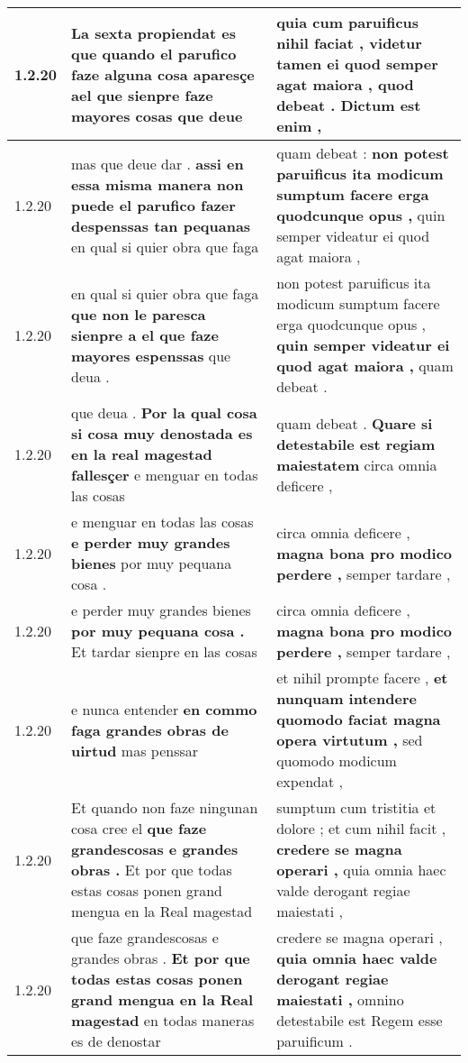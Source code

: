 \begin{tabular}{|p{1cm}|p{6.5cm}|p{6.5cm}|}
1.2.20 & La sexta propiendat es que quando el parufico faze alguna cosa aparesçe ael \textbf{ que sienpre faze mayores cosas } que deue & quia cum paruificus nihil faciat , \textbf{ videtur tamen ei quod semper agat maiora , } quod debeat . Dictum est enim , \\\hline
1.2.20 & mas que deue dar . \textbf{ assi en essa misma manera non puede el parufico fazer despenssas tan pequanas } en qual si quier obra que faga & quam debeat : \textbf{ non potest paruificus ita modicum sumptum facere erga quodcunque opus , } quin semper videatur ei quod agat maiora , \\\hline
1.2.20 & en qual si quier obra que faga \textbf{ que non le paresca sienpre a el que faze mayores espenssas } que deua . & non potest paruificus ita modicum sumptum facere erga quodcunque opus , \textbf{ quin semper videatur ei quod agat maiora , } quam debeat . \\\hline
1.2.20 & que deua . \textbf{ Por la qual cosa si cosa muy denostada es en la real magestad fallesçer } e menguar en todas las cosas & quam debeat . \textbf{ Quare si detestabile est regiam maiestatem } circa omnia deficere , \\\hline
1.2.20 & e menguar en todas las cosas \textbf{ e perder muy grandes bienes } por muy pequana cosa . & circa omnia deficere , \textbf{ magna bona pro modico perdere , } semper tardare , \\\hline
1.2.20 & e perder muy grandes bienes \textbf{ por muy pequana cosa . } Et tardar sienpre en las cosas & circa omnia deficere , \textbf{ magna bona pro modico perdere , } semper tardare , \\\hline
1.2.20 & e nunca entender \textbf{ en commo faga grandes obras de uirtud } mas penssar & et nihil prompte facere , \textbf{ et nunquam intendere quomodo faciat magna opera virtutum , } sed quomodo modicum expendat , \\\hline
1.2.20 & Et quando non faze ningunan cosa cree el \textbf{ que faze grandescosas e grandes obras . } Et por que todas estas cosas ponen grand mengua en la Real magestad & sumptum cum tristitia et dolore ; et cum nihil facit , \textbf{ credere se magna operari , } quia omnia haec valde derogant regiae maiestati , \\\hline
1.2.20 & que faze grandescosas e grandes obras . \textbf{ Et por que todas estas cosas ponen grand mengua en la Real magestad } en todas maneras es de denostar & credere se magna operari , \textbf{ quia omnia haec valde derogant regiae maiestati , } omnino detestabile est Regem esse paruificum . \\\hline

\end{tabular}
